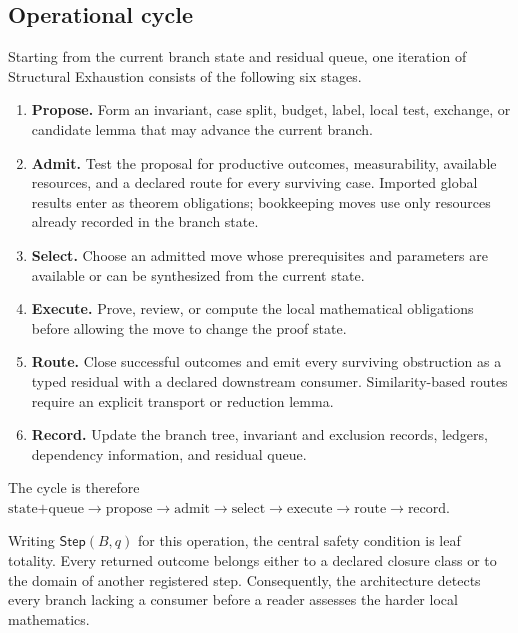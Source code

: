 \documentclass[11pt]{article}
\begin{document}
\subsection{Operational cycle}
Starting from the current branch state and residual queue, one iteration of
Structural Exhaustion consists of the following six stages.
\begin{enumerate}[leftmargin=*,label=\textbf{\arabic*.},itemsep=0.35em]
\item \textbf{Propose.} Form an invariant, case split, budget, label, local
test, exchange, or candidate lemma that may advance the current branch.
\item \textbf{Admit.} Test the proposal for productive outcomes,
measurability, available resources, and a declared route for every surviving
case. Imported global results enter as theorem obligations; bookkeeping moves
use only resources already recorded in the branch state.
\item \textbf{Select.} Choose an admitted move whose prerequisites and
parameters are available or can be synthesized from the current state.
\item \textbf{Execute.} Prove, review, or compute the local mathematical
obligations before allowing the move to change the proof state.
\item \textbf{Route.} Close successful outcomes and emit every surviving
obstruction as a typed residual with a declared downstream consumer.
Similarity-based routes require an explicit transport or reduction lemma.
\item \textbf{Record.} Update the branch tree, invariant and exclusion
records, ledgers, dependency information, and residual queue.
\end{enumerate}
The cycle is therefore
\(\text{state+queue}\to\text{propose}\to\text{admit}\to\text{select}
\to\text{execute}\to\text{route}\to\text{record}\).

Writing \(\mathsf{Step}(B,q)\) for this operation, the central safety condition
is leaf totality. Every returned outcome belongs either to a declared closure
class or to the domain of another registered step. Consequently, the
architecture detects every branch lacking a consumer before a reader assesses
the harder local mathematics.
\end{document}
